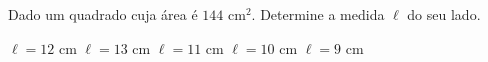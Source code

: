 Dado um quadrado cuja área é $144$ cm$^2$. Determine a medida $\ell$ do seu lado.

$\ell=12$ cm
$\ell=13$ cm
$\ell=11$ cm
$\ell=10$ cm
$\ell=9$ cm


